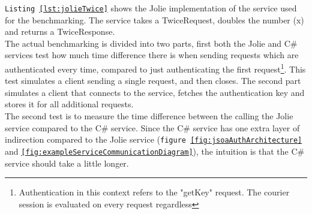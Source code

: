 \documentclass[12pt,a4paper]{article}
\begin{document}
\texttt{Listing \ref{lst:jolieTwice}} shows the Jolie implementation of the service used for the benchmarking. The service takes a TwiceRequest, doubles the number (x) and returns a TwiceResponse.\\

The actual benchmarking is divided into two parts, first both the Jolie and C\# services test how much time difference there is when sending requests which are authenticated every time, compared to just authenticating the first request\footnote{Authentication in this context refers to the "getKey" request. The courier session is evaluated on every request regardless}. This test simulates a client sending a single request, and then closes. The second part simulates a client that connects to the service, fetches the authentication key and stores it for all additional requests.\\

The second test is to measure the time difference between the calling the Jolie service compared to the C\# service. Since the C\# service has one extra layer of indirection compared to the Jolie service (\texttt{figure \ref{fig:jsoaAuthArchitecture}} and \texttt{\ref{fig:exampleServiceCommunicationDiagram}}), the intuition is that the C\# service should take a little longer.
\end{document}
